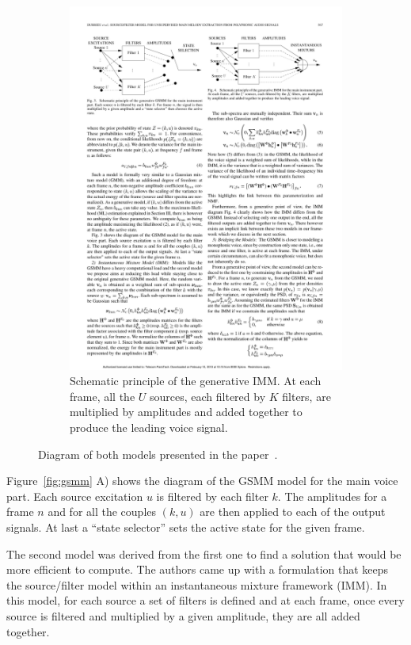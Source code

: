\begin{figure}[b]
\begin{subfigure}[b]{0.48\textwidth}
                \includegraphics[width=\textwidth]{Figures/imm}
                \caption{Schematic principle of the generative IMM. At each frame, all the $U$ sources, each filtered by $K$ filters, are multiplied by amplitudes and added together to produce the leading voice signal.}
                \label{fig:imm}
        \end{subfigure}
          \caption{Diagram of both models presented in the paper~\cite{durrieu}.}
        \label{fig:gsmmimm}
\end{figure}

Figure~\ref{fig:gsmm}  A) shows the diagram of the GSMM model for the main voice part. Each source excitation $u$ is filtered by each filter $k$. The amplitudes for a frame $n$ and for all the couples $(k, u)$ are then applied to each of the output signals. At last a ``state selector'' sets the active state for the given frame.

The second model was derived from the first one to find a solution that would be more efficient to compute. The authors came up with a formulation that keeps the source/filter model within an instantaneous mixture framework (IMM). In this model, for each source a set of filters is defined and at each frame, once every source is filtered and multiplied by a given amplitude, they are all added together.

